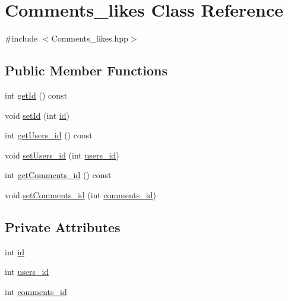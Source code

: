 \hypertarget{class_comments__likes}{}\section{Comments\+\_\+likes Class Reference}
\label{class_comments__likes}


{\ttfamily \#include $<$Comments\+\_\+likes.\+hpp$>$}

\subsection*{Public Member Functions}
\begin{DoxyCompactItemize}
\item 
int \hyperlink{class_comments__likes_a0f8d334bb3e500b0088959074938a6fa}{get\+Id} () const
\item 
void \hyperlink{class_comments__likes_ae90675ee5f5f18f669ee0690e0cd1a80}{set\+Id} (int \hyperlink{class_comments__likes_a84dd42c2fa62720dd82af70e82b1c842}{id})
\item 
int \hyperlink{class_comments__likes_a74ddade11bc270fcc4c8446b47124386}{get\+Users\+\_\+id} () const
\item 
void \hyperlink{class_comments__likes_a548b1c60f518d18d1d26a5d0df83c003}{set\+Users\+\_\+id} (int \hyperlink{class_comments__likes_a5d67f819db937fc4e7cd66181f97d80e}{users\+\_\+id})
\item 
int \hyperlink{class_comments__likes_a1d5af3bd550ef65fb0117ce9b91ecaff}{get\+Comments\+\_\+id} () const
\item 
void \hyperlink{class_comments__likes_a77f6127e7b7548dc10253b87740d9616}{set\+Comments\+\_\+id} (int \hyperlink{class_comments__likes_a34be0ad9cc104203c76a78186c0b09a4}{comments\+\_\+id})
\end{DoxyCompactItemize}
\subsection*{Private Attributes}
\begin{DoxyCompactItemize}
\item 
int \hyperlink{class_comments__likes_a84dd42c2fa62720dd82af70e82b1c842}{id}
\item 
int \hyperlink{class_comments__likes_a5d67f819db937fc4e7cd66181f97d80e}{users\+\_\+id}
\item 
int \hyperlink{class_comments__likes_a34be0ad9cc104203c76a78186c0b09a4}{comments\+\_\+id}
\end{DoxyCompactItemize}


